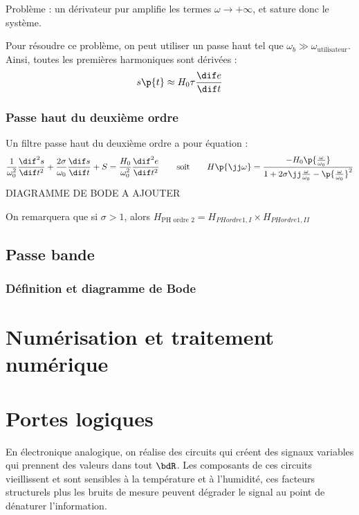     Problème : un dérivateur pur amplifie les termes $\omega \to +\infty$, et sature donc le système.
    
    Pour résoudre ce problème, on peut utiliser un passe haut tel que $\omega_b \gg \omega_\text{utilisateur}$. Ainsi, toutes les premières harmoniques sont dérivées :
    \[ s\p{t} \approx H_0\tau\dfrac{\dif e}{\dif t}\]
    
    \subsubsection{Passe haut du deuxième ordre}
    
    Un filtre passe haut du deuxième ordre a pour équation :
    \[ \dfrac{1}{\omega_0^2} \dfrac{\dif^2 s}{\dif t^2} + \dfrac{2\sigma}{\omega_0}\dfrac{\dif s}{\dif t} + S = \dfrac{H_0}{\omega_0^2} \dfrac{\dif^2 e}{\dif t^2} \qquad\text{soit}\qquad H\p{\jj\omega} = \dfrac{-H_0\p{\frac{\omega}{\omega_0}}}{1 + 2\sigma\jj\frac{\omega}{\omega_0} - \p{\frac{\omega}{\omega_0}}^2} \]
    DIAGRAMME DE BODE A AJOUTER
    
    On remarquera que si $\sigma > 1$, alors $H_\text{PH ordre 2} = H_{PH ordre 1, I}\times H_{PH ordre 1, II}$

    \subsection{Passe bande}
    
    \subsubsection{Définition et diagramme de Bode}
    
    \section{Numérisation et traitement numérique}
    
    \section{Portes logiques}
    
    En électronique analogique, on réalise des circuits qui créent des signaux variables qui prennent des valeurs dans tout $\bdR$. Les composants de ces circuits vieillissent et sont sensibles à la température et à l'humidité, ces facteurs structurels plus les bruits de mesure peuvent dégrader le signal au point de dénaturer l'information.
    
